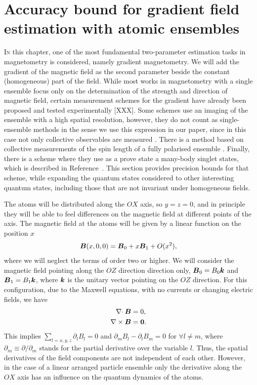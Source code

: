\section[Metrology of the gradient magnetic field]
{Accuracy bound for gradient field estimation with atomic ensembles}


\lettrine[lines=2, findent=3pt, nindent=0pt]{I}{n} this chapter, one of the most fundamental two-parameter estimation tasks in magnetometry is considered, namely gradient magnetometry.
We will add the gradient of the magnetic field as the second parameter beside the constant (homogeneous) part of the field.
While most works in magnetometry with a single ensemble focus only on the determination of the strength and direction of magnetic field, certain measurement schemes for the gradient have already been proposed and tested experimentally [XXX].
Some schemes use an imaging of the ensemble with a high spatial resolution, however, they do not count as single-ensemble methods in the sense we use this expression in our paper, since in this case not only collective observables are measured  \cite{Vengalattore2007,Zhou2010,Koschorreck2011}.
There is a method based on collective measurements of the spin length of a fully polarised ensemble \cite{Behbood2013}.
Finally, there is a scheme where they use as a prove state a many-body singlet states, which is described in Reference~\cite{UH13}.
This section provides precision bounds for that scheme, while expanding the quantum states considered to other interesting quantum states, including those that are not invariant under homogeneous fields.

The atoms will be distributed along the $OX$ axis, so $y=z=0$, and in principle they will be able to feel differences on the magnetic field at different points of the axis.
The magnetic field at the atoms will be given by a linear function on the position $x$
\begin{equation}
\boldsymbol{B}(x,0,0)=\boldsymbol{B}_0 +x \boldsymbol{B}_1 + O(x^2),
\end{equation}
where we will neglect the terms of order two or higher.
We will consider the magnetic field pointing along the $OZ$ direction direction only, $\boldsymbol{B}_0=B_0 \boldsymbol{k}$ and $\boldsymbol{B}_1=B_1\boldsymbol{k}$, where $\boldsymbol{k}$ is the unitary vector pointing on the $OZ$ direction.
For this configuration, due to the Maxwell equations, with no currents or changing electric fields, we have
\begin{align}
\nabla \cdotp \boldsymbol{B}&=0, \nonumber \\
\nabla \times \boldsymbol{B}&=\boldsymbol{0}.
\end{align}
This implies $\sum_{l=x,y,z} \partial_l B_l=0$ and $ \partial_m B_l - \partial_l B_m =0$ for $\forall l\ne m$, where $\partial_m\equiv \partial/\partial_m$ stands for the partial derivative over the variable $l$.
Thus, the spatial derivatives of the field components are not independent of each other.
However, in the case of a linear arranged particle ensemble only the derivative along the $OX$ axis has an influence on the quantum dynamics of the atoms.

